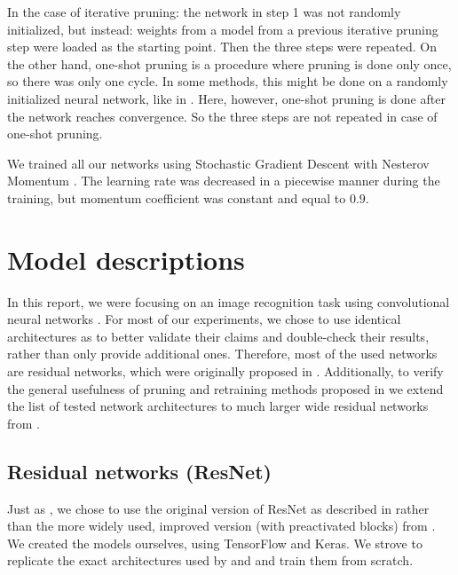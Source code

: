 In the case of iterative pruning: the network in step 1 was not randomly initialized, but instead: weights from a model from a previous iterative pruning step were loaded as the starting point.
Then the three steps were repeated.
On the other hand, one-shot pruning is a procedure where pruning is done only once, so there was only one cycle.
In some methods, this might be done on a randomly initialized neural network, like in \cite{snip}.
Here, however, one-shot pruning is done after the network reaches convergence.
So the three steps are not repeated in case of one-shot pruning.

We trained all our networks using Stochastic Gradient Descent with Nesterov Momentum \cite{nesterov}. The learning rate was decreased in a piecewise manner during the training, but momentum coefficient was constant and equal to $0.9$.

\section{Model descriptions}

In this report, we were focusing on an image recognition task using convolutional neural networks \cite{lecun_convnet}. 
For most of our experiments, we chose to use identical architectures as \cite{Renda} to better validate their claims and double-check their results, rather than only provide additional ones.
Therefore, most of the used networks are residual networks, which were originally proposed in \cite{resnet}.
Additionally, to verify the general usefulness of pruning and retraining methods proposed in \cite{Renda} we extend the list of tested network architectures to much larger wide residual networks from \cite{wrn}.

\subsection{Residual networks (ResNet)}

Just as \cite{Renda}, we chose to use the original version of ResNet as described in \cite{resnet} rather than the more widely used, improved version (with preactivated blocks) from \cite{resnetv2}. We created the models ourselves, using TensorFlow \cite{tensorflow} and Keras. We strove to replicate the exact architectures used by \cite{Renda} and \cite{resnet} and train them from scratch.

